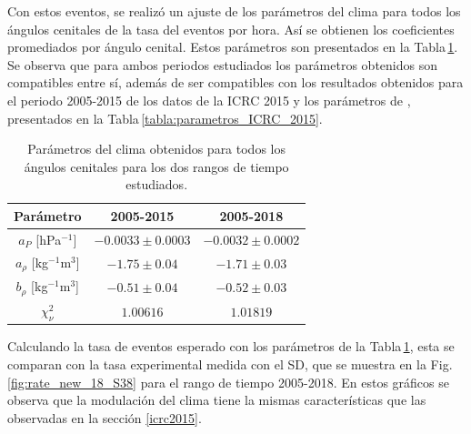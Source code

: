 			
			Con estos eventos, se realizó un  ajuste de los parámetros del clima para todos los ángulos cenitales de la tasa del eventos por hora. Así se obtienen los coeficientes promediados por ángulo cenital. Estos parámetros son presentados en la Tabla\,\ref{tabla:parametros_ICRC_2019_S38}. Se observa que para ambos periodos estudiados los parámetros obtenidos son compatibles entre sí, además de ser compatibles con los resultados obtenidos para el periodo 2005-2015 de los datos de la ICRC 2015 y los parámetros de \cite{aab2017impact}, presentados en la Tabla\,\ref{tabla:parametros_ICRC_2015}.

			\begin{table}[H]
				\centering
				\begin{tabular}{|c|c|c|}
				\hline
				\textbf{Parámetro}          & \textbf{2005-2015}    		& \textbf{2005-2018}    \\ \hline
				$a_P$ [hPa$^{-1}$]          & $ -0.0033\pm 0.0003$      	& $ -0.0032\pm 0.0002$  \\ \hline
				$a_\rho$ [kg$^{-1}$m$^3$]   & $ -1.75\pm 0.04$            	& $ -1.71\pm 0.03$       \\ \hline
				$b_\rho$ [kg$^{-1}$m$^3$]   & $ -0.51\pm 0.04$             	& $ -0.52\pm 0.03$       \\ \hline
				$\chi^2_\nu$                & $1.00616$                     & $1.01819$              \\   \hline
				\end{tabular} 
				\caption{Parámetros del clima obtenidos para todos los ángulos cenitales para los dos rangos de tiempo estudiados.} \label{tabla:parametros_ICRC_2019_S38}
			\end{table}
			
			Calculando la tasa de eventos esperado con los parámetros de la Tabla\,\ref{tabla:parametros_ICRC_2019_S38}, esta se comparan con la tasa experimental medida con el SD, que se muestra en la Fig. \ref{fig:rate_new_18_S38} para el rango de tiempo 2005-2018. En estos gráficos se observa que la modulación del clima tiene la mismas características que las observadas en la sección \ref{icrc2015}.

